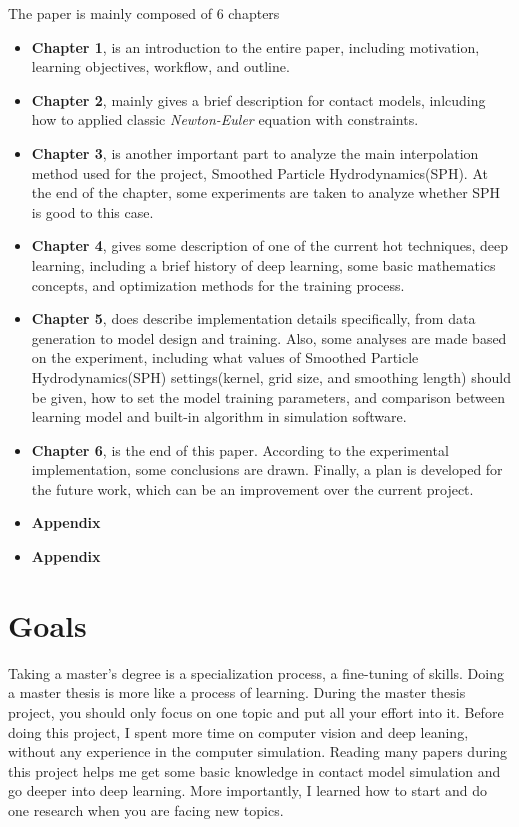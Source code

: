         The paper is mainly composed of 6 chapters
    \begin{itemize}
        \item \textbf{Chapter 1}, is an introduction to the entire paper, including motivation, learning objectives, workflow, and outline.

        \item \textbf{Chapter 2}, mainly gives a brief description for contact models, inlcuding how to applied classic \textit{Newton-Euler} equation with constraints.

        \item \textbf{Chapter 3}, is another important part to analyze the main interpolation method used for the project, Smoothed Particle Hydrodynamics(SPH). At the end of the chapter, some experiments are taken to analyze whether SPH is good to this case.

        \item \textbf{Chapter 4}, gives some description of one of the current hot techniques, deep learning, including a brief history of deep learning, some basic mathematics concepts, and optimization methods for the training process.

        \item \textbf{Chapter 5}, does describe implementation details specifically, from data generation to model design and training. Also, some analyses are made based on the experiment, including what values of Smoothed Particle Hydrodynamics(SPH) settings(kernel, grid size, and smoothing length) should be given, how to set the model training parameters, and comparison between learning model and built-in algorithm in simulation software.

        \item \textbf{Chapter 6}, is the end of this paper. According to the experimental implementation, some conclusions are drawn. Finally, a plan is developed for the future work, which can be an improvement over the current project.

        \item \textbf{Appendix}

        \item \textbf{Appendix}
    \end{itemize}


\section{Goals}
    Taking a master’s degree is a specialization process, a fine-tuning of skills. Doing a master thesis is more like a process of learning. During the master thesis project, you should only focus on one topic and put all your effort into it. Before doing this project, I spent more time on computer vision and deep leaning, without any experience in the computer simulation. Reading many papers during this project helps me get some basic knowledge in contact model simulation and go deeper into deep learning. More importantly, I learned how to start and do one research when you are facing new topics.\\ 

